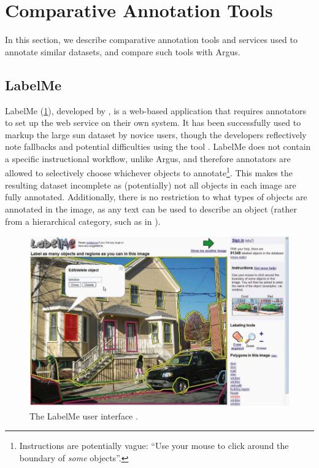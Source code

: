 \section{Comparative Annotation Tools}
\label{sec:dataset:architecture_evaluation:tools}

In this section, we describe comparative annotation tools and services used to annotate similar datasets, and compare such tools with Argus.

\subsection{LabelMe} 

LabelMe (\cref{fig:dataset:architecture_evaluation:tools:label_me}), developed by \citet{Russell:2008wm}, is a web-based application that requires annotators to set up the web service on their own system. It has been successfully used to markup the large \gls{sun} dataset by novice users, though the developers reflectively note fallbacks and potential difficulties using the tool \citep{DBLP:journals/corr/abs-1210-3448}. LabelMe does not contain a specific instructional workflow, unlike Argus, and therefore annotators are allowed to selectively choose whichever objects to annotate\footnote{Instructions are potentially vague: ``Use your mouse to click around the boundary of \textit{some} objects''.}. This makes the resulting dataset incomplete as (potentially) not all objects in each image are fully annotated. Additionally, there is no restriction to what types of objects are annotated in the image, as any text can be used to describe an object (rather from a hierarchical category, such as in \citep{Lin:2014vma}).

\begin{figure}[h]
  \includegraphics[width=\textwidth]{images/dataset/tools/label_me}
  \caption[The LabelMe user interface]{The LabelMe user interface \citep{Russell:2008wm}.}
  \label{fig:dataset:architecture_evaluation:tools:label_me}
\end{figure}

